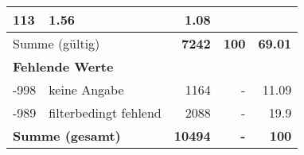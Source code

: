 \begin{longtable}{lXrrr}
       \num{113} &
       \num[round-mode=places,round-precision=2]{1,56} &
         \num[round-mode=places,round-precision=2]{1,08} \\
     \midrule
     \multicolumn{2}{l}{Summe (gültig)} &
       \textbf{\num{7242}} &
     \textbf{100} &
       \textbf{\num[round-mode=places,round-precision=2]{69,01}} \\
     \multicolumn{5}{l}{\textbf{Fehlende Werte}}\\
       -998 &
       keine Angabe &
         \num{1164} &
        - &
         \num[round-mode=places,round-precision=2]{11,09} \\
       -989 &
       filterbedingt fehlend &
         \num{2088} &
        - &
         \num[round-mode=places,round-precision=2]{19,9} \\
     \midrule
     \multicolumn{2}{l}{\textbf{Summe (gesamt)}} &
          \textbf{\num{10494}} &
        \textbf{-} &
        \textbf{100} \\
     \bottomrule
     \end{longtable}
     
